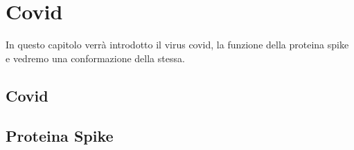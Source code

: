 \chapter{Covid}\label{chapter:Covid}
In questo capitolo verrà introdotto il virus covid, la funzione della proteina spike e vedremo una conformazione della stessa. 


\section{Covid}\label{sec:cap_sec_subsec}

\section{Proteina Spike}\label{sec:cap_sec_subsec}





